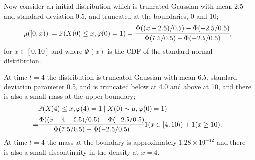 \begin{example}\label{ex: wave 6}
	Now consider an initial distribution which is truncated Gaussian with mean 2.5 and standard deviation 0.5, and truncated at the boundaries, 0 and 10;
	\begin{align}
		\mu([0,x)) := \mathbb P(X(0)\leq x, \varphi(0)=1)=\cfrac{\Phi((x-2.5)/0.5)-\Phi(-2.5/0.5)}{\Phi(7.5/0.5)-\Phi(-2.5/0.5)}, \label{eqn: kdjfksdf}
	\end{align}
	for \(x\in[0,10]\) and where \(\Phi(x)\) is the CDF of the standard normal distribution.

	At time \(t=4\) the distribution is truncated Gaussian with mean 6.5, standard deviation parameter 0.5, and is truncated below at 4.0 and above at 10, and there is also a small mass at the upper boundary; 
	\begin{align}
		\nonumber & \mathbb P(X(4)\leq x, \varphi(4)=1\mid X(0)\sim\mu, \varphi(0)=1)  
		\\=&\cfrac{\Phi((x-4-2.5)/0.5)-\Phi(-2.5/0.5)}{\Phi(7.5/0.5)-\Phi(-2.5/0.5)}1(x\in[4,10)) 
		+ 1(x\geq 10).\label{eqn: bbbbbaabbaa}%
	\end{align}
	At time \(t=4\) the mass at the boundary is approximately \(1.28\times 10^{-12}\) and there is also a small discontinuity in the density at \(x=4\).


\end{example}
